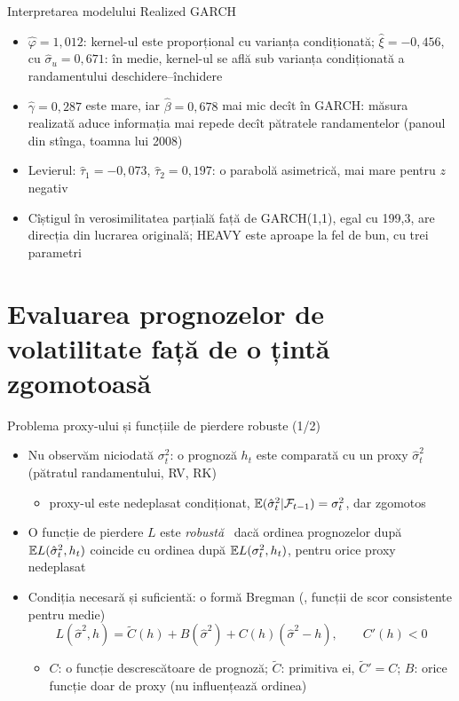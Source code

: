 \begin{frame}{Interpretarea modelului Realized GARCH}
\itemsize{\small}
\begin{itemize}
    \item $\hat\varphi = 1{,}012$: kernel-ul este proporțional cu varianța condiționată; $\hat\xi = \ensuremath{-}0{,}456$, cu $\hat\sigma_u = 0{,}671$: în medie, kernel-ul se află sub varianța condiționată a randamentului deschidere--închidere
    \item $\hat\gamma = 0{,}287$ este mare, iar $\hat\beta = 0{,}678$ mai mic decît în GARCH: măsura realizată aduce informația mai repede decît pătratele randamentelor (panoul din stînga, toamna lui 2008)
    \item Levierul: $\hat\tau_1 = \ensuremath{-}0{,}073$, $\hat\tau_2 = 0{,}197$: o parabolă asimetrică, mai mare pentru $z$ negativ
    \item Cîștigul în verosimilitatea parțială față de GARCH(1,1), egal cu 199{,}3, are direcția din lucrarea originală; HEAVY este aproape la fel de bun, cu trei parametri
\end{itemize}
\end{frame}


\section{Evaluarea prognozelor de volatilitate față de o țintă zgomotoasă}

\begin{frame}{Problema proxy-ului și funcțiile de pierdere robuste (1/2)}
\itemsize{\small}
\begin{itemize}
    \item Nu observăm niciodată $\sigma^2_t$: o prognoză $h_t$ este comparată cu un proxy $\hat\sigma^2_t$ (pătratul randamentului, RV, RK)
    \begin{itemize}
        \item proxy-ul este nedeplasat condiționat, $\mathbb{E}(\hat\sigma^2_t | \mathcal F_{t-1}) = \sigma^2_t$, dar zgomotos
    \end{itemize}
    \item O funcție de pierdere $L$ este \emph{robustă} \ dacă ordinea prognozelor după $\mathbb{E} L(\hat\sigma^2_t, h_t)$ coincide cu ordinea după $\mathbb{E} L(\sigma^2_t, h_t)$, pentru orice proxy nedeplasat 
    \item Condiția necesară și suficientă: o formă Bregman (, funcții de scor consistente pentru medie)
    \[ L(\hat\sigma^2, h) = \tilde C(h) + B(\hat\sigma^2) + C(h)(\hat\sigma^2 - h), \qquad C'(h) < 0 \]
    \begin{itemize}
        \item $C$: o funcție descrescătoare de prognoză; $\tilde C$: primitiva ei, $\tilde C' = C$; $B$: orice funcție doar de proxy (nu influențează ordinea)
    \end{itemize}
\end{itemize}
\end{frame}

